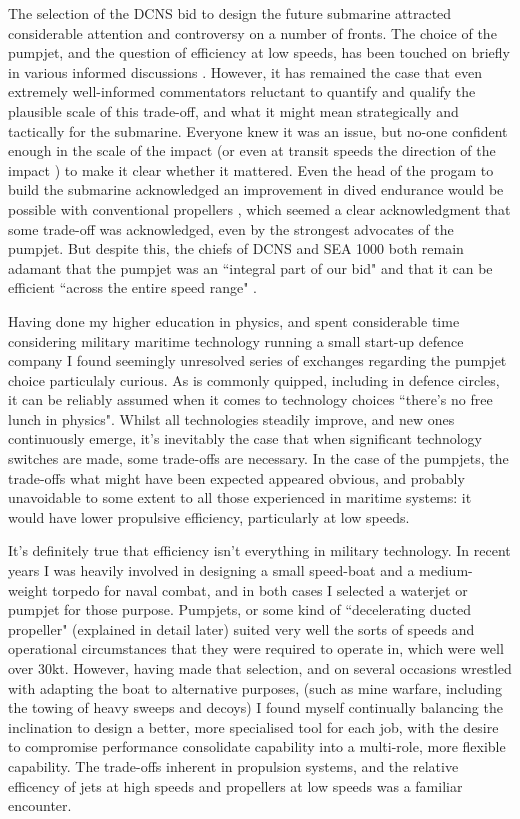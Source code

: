 \documentclass{article}\usepackage[]{graphicx}\usepackage[]{color}
\begin{document}
The selection of the DCNS bid to design the future submarine attracted considerable attention and controversy on a number of fronts. The choice of the pumpjet, and the question of efficiency at low speeds, has been touched on briefly in various informed discussions \parencite{stanford2017} \parencite{davies2017}.  However, it has remained the case that even extremely well-informed commentators reluctant to quantify and qualify the plausible scale of this trade-off, and what it might mean strategically and tactically for the submarine. Everyone knew it was an issue, but no-one confident enough in the scale of the impact (or even at transit speeds the direction of the impact \parencite{davies2017}) to make it clear whether it mattered. Even the head of the progam to build the submarine acknowledged an improvement in dived endurance would be possible with conventional propellers \parencite{sbs2017}, which seemed a clear acknowledgment that some trade-off was acknowledged, even by the strongest advocates of the pumpjet.  But despite this, the chiefs of DCNS and SEA 1000 both remain adamant that the pumpjet was an ``integral part of our bid" \parencite{guillou2017} and that it can be efficient ``across the entire speed range" \parencite{sammut2017}.

Having done my higher education in physics, and spent considerable time considering military maritime technology running a small start-up defence company I found seemingly unresolved series of exchanges regarding the pumpjet choice particulaly curious.  As is commonly quipped, including in defence circles, it can be reliably assumed when it comes to technology choices ``there's no free lunch in physics".  Whilst all technologies steadily improve, and new ones continuously emerge, it's inevitably the case that when significant technology switches are made, some trade-offs are necessary. In the case of the pumpjets, the trade-offs what might have been expected appeared obvious, and probably unavoidable to some extent to all those experienced in maritime systems: it would have lower propulsive efficiency, particularly at low speeds.

It's definitely true that efficiency isn't everything in military technology.  In recent years I was heavily involved in designing a small speed-boat and a medium-weight torpedo for naval combat, and in both cases I selected a waterjet or pumpjet for those purpose. Pumpjets, or some kind of ``decelerating ducted propeller" (explained in detail later) suited very well the sorts of speeds and operational circumstances that they were required to operate in, which were well over 30kt. However, having made that selection, and on several occasions wrestled with adapting the boat to alternative purposes, (such as mine warfare, including the towing of heavy sweeps and decoys) I found myself continually balancing the inclination to design a better, more specialised tool for each job, with the desire to compromise performance consolidate capability into a multi-role, more flexible capability.  The trade-offs inherent in propulsion systems, and the relative efficency of jets at high speeds and propellers at low speeds was a familiar encounter.
\end{document}
